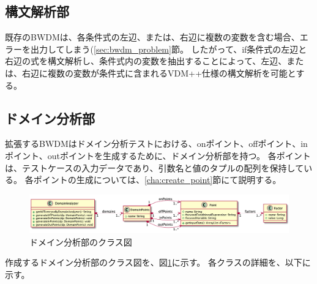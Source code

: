 \documentclass[uplatex, report, a4j, 10pt]{jsbook}
\newcommand\ttt[1]{\texttt{#1}}
\begin{document}
\subsection{構文解析部}
既存のBWDMは、各条件式の左辺、または、右辺に複数の変数を含む場合、エラーを出力してしまう(\ref{sec:bwdm_problem}節。
したがって、if条件式の左辺と右辺の式を構文解析し、条件式内の変数を抽出することによって、左辺、または、右辺に複数の変数が条件式に含まれるVDM++仕様の構文解析を可能とする。

\subsection{ドメイン分析部}\label{cha:DomainAnalyzer}
拡張するBWDMはドメイン分析テストにおける、onポイント、offポイント、inポイント、outポイントを生成するために、ドメイン分析部を持つ。
各ポイントは、テストケースの入力データであり、引数名と値のタプルの配列を保持している。
各ポイントの生成については、\ref{cha:create_point}節にて説明する。

\begin{figure}[t]
  \begin{center}
    \includegraphics[keepaspectratio, width=160mm]{figs/DomainAnalyzer.png}
    \caption{ドメイン分析部のクラス図}
    \label{fig:class_DomainAnalyzer}
  \end{center}
\end{figure}

作成するドメイン分析部のクラス図を、図\ref{fig:class_DomainAnalyzer}に示す。
各クラスの詳細を、以下に示す。

\newcommand{\forcusedConditionalExpression}{\ttt{forcusedConditionalExpression}}
\end{document}
